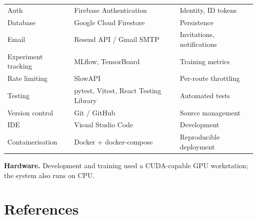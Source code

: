 \documentclass[12pt,a4paper,oneside]{report}
\begin{document}
\begin{longtable}{L{2.8cm}L{4.5cm}X}
Auth                 & Firebase Authentication                 & Identity, ID tokens \\
Database             & Google Cloud Firestore                  & Persistence \\
Email                & Resend API / Gmail SMTP                 & Invitations, notifications \\
Experiment tracking  & MLflow, TensorBoard                     & Training metrics \\
Rate limiting        & SlowAPI                                 & Per-route throttling \\
Testing              & pytest, Vitest, React Testing Library   & Automated tests \\
Version control      & Git / GitHub                            & Source management \\
IDE                  & Visual Studio Code                      & Development \\
Containerisation     & Docker + docker-compose                 & Reproducible deployment \\
\end{longtable}

\textbf{Hardware.} Development and training used a CUDA-capable GPU workstation; the system
also runs on CPU.

\chapter*{References}
\end{document}
